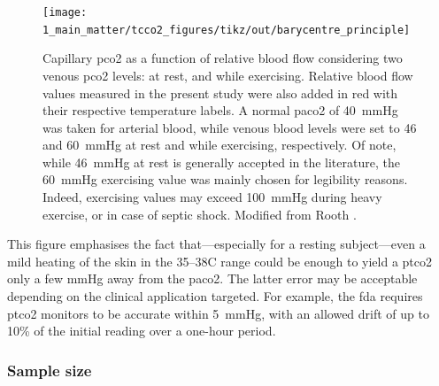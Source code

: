 \begin{figure}
	\centering
	\texttt{[image: 1\_main\_matter/tcco2\_figures/tikz/out/barycentre\_principle]}
	\caption[Capillary \gls{pco2} as a function of relative blood flow considering two venous \gls{pco2} levels: at rest, and while exercising.]{Capillary \gls{pco2} as a function of relative blood flow considering two venous \gls{pco2} levels: at rest, and while exercising. Relative blood flow values measured in the present study were also added in red with their respective temperature labels. A normal \gls{paco2} of 40~mmHg\cite{schneider2013} was taken for arterial blood, while venous blood levels were set to 46 and 60~mmHg at rest and while exercising, respectively. Of note, while 46~mmHg at rest is generally accepted in the literature\cite{byrne2014}, the 60~mmHg exercising value was mainly chosen for legibility reasons. Indeed, exercising values may exceed 100~mmHg during heavy exercise, or in case of septic shock\cite{kowalchuk1988, diaztagle2017}. Modified from Rooth \etal{}\cite{rooth1987}.}\label{fig:tcco2:barycentre_principle}
\end{figure} %

This figure emphasises the fact that---especially for a resting subject---even a mild heating of the skin in the 35--38{\degree}C range could be enough to yield a \gls{ptco2} only a few mmHg away from the \gls{paco2}. The latter error may be acceptable depending on the clinical application targeted. For example, the \gls{fda} requires \gls{ptco2} monitors to be accurate within 5~mmHg, with an allowed drift of up to 10\% of the initial reading over a one-hour period\cite{fda_transcut}.

\subsubsection{Sample size}\label{subsect:tcco2:sample_size}

